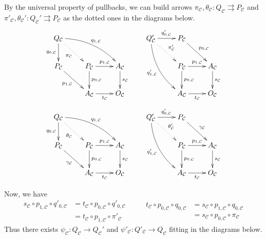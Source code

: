 \documentclass[a4paper,UKenglish,cleveref,pdftex,thm-restate,numberwithinsect]{lipics-v2021}
\renewcommand{\P}{\textbf {\textup{P}}}
\begin{document}
\begin{definition}
\begin{enumerate}
By the universal property of pullbacks, we can build arrows $\pi_{\mathcal{C}},\theta_{\mathcal{C}}\colon Q_{\mathcal{C}} \rightrightarrows P_{\mathcal{C}}$ and $\pi'_{\mathcal{C}},\theta_{\mathcal{C}}'\colon Q_{\mathcal{C}}'\rightrightarrows P_{\mathcal{C}}$ as the dotted ones in the diagrams below.
		\[\xymatrix{Q_{\mathcal{C}} \ar@/^.4cm/[drr]^{q_{1, \mathcal{C}}} \ar[d]_{q_{0, \mathcal{C}}} \ar@{.>}[dr]_{\pi_\mathcal{C}} &&&Q_{\mathcal{C}}' \ar[r]^{q'_{0, \mathcal{C}}} \ar@{.>}[dr]^{\pi_{\mathcal{C}}'} \ar@/_.4cm/[ddr]_{q'_{1, \mathcal{C}}}& P_{\mathcal{C}}\ar[dr]^{p_{0,\mathcal{C}}}\\P_{\mathcal{C}} \ar[dr]_{p_{1,\mathcal{C}}}&P_{\mathcal{C}} \ar[r]^{p_{1, \mathcal{C}}} \ar[d]^{p_{0, \mathcal{C}}} &A_{\mathcal{C}} \ar[d]^{s_{\mathcal{C}}} &  &P_{\mathcal{C}} \ar[r]^{p_{1, \mathcal{C}}} \ar[d]^{p_{0, \mathcal{C}}} &A_{\mathcal{C}} \ar[d]^{s_{\mathcal{C}}}\\ &A_{\mathcal{C}} \ar[r]_{t_{\mathcal{C}}}  &O_{\mathcal{C}} & &A_{\mathcal{C}} \ar[r]_{t_{\mathcal{C}}}  &O_{\mathcal{C}}}\]
			\[\xymatrix{Q_{\mathcal{C}} \ar@/^.4cm/[drr]^{q_{1, \mathcal{C}}} \ar[d]_{q_{0, \mathcal{C}}} \ar@{.>}[dr]_{\theta_{\mathcal{C}}} &&&Q_{\mathcal{C}}' \ar[r]^{q'_{0, \mathcal{C}}} \ar@{.>}[dr]^{\theta_{\mathcal{C}}'} \ar@/_.4cm/[ddr]_{q'_{1, \mathcal{C}}}& P_{\mathcal{C}}\ar[dr]^{\gamma_{\mathcal{C}}}\\P_{\mathcal{C}} \ar[dr]_{\gamma_{\mathcal{C}}}&P_{\mathcal{C}} \ar[r]^{p_{1, \mathcal{C}}} \ar[d]^{p_{0, \mathcal{C}}} &A_{\mathcal{C}} \ar[d]^{s_{\mathcal{C}}} &  &P_{\mathcal{C}} \ar[r]^{p_{1, \mathcal{C}}} \ar[d]^{p_{0, \mathcal{C}}} &A_{\mathcal{C}} \ar[d]^{s_{\mathcal{C}}}\\ &A_{\mathcal{C}} \ar[r]_{t_{\mathcal{C}}}  &O_{\mathcal{C}} & &A_{\mathcal{C}} \ar[r]_{t_{\mathcal{C}}}  &O_{\mathcal{C}}}\]
	
Now, we have
\[\begin{split}
	s_{\mathcal{C}}\circ p_{1, \mathcal{C}}\circ q'_{0, \mathcal{C}} &= t_{\mathcal{C}}\circ p_{0, \mathcal{C}}\circ q'_{0, \mathcal{C}}\\&=t_{\mathcal{C}}\circ p_{1, \mathcal{C} } \circ \pi'_{\mathcal{C}}
\end{split}\qquad \begin{split}
t_{\mathcal{C}}\circ p_{0, \mathcal{C}}\circ q_{0, \mathcal{C}} &= s_{\mathcal{C}}\circ p_{1, \mathcal{C}}\circ q_{0, \mathcal{C}}\\&=s_{\mathcal{C}}\circ p_{0, \mathcal{C} } \circ \pi_{\mathcal{C}}
\end{split}\]
 Thus there exists $\psi_{\mathcal{C}}\colon Q_{\mathcal{C}} \to Q_{\mathcal{C}}'$ and $\psi'_{\mathcal{C}}\colon Q'_\mathcal{C}\to Q_{\mathcal{C}}$ fitting in the diagrams below.
	

\end{enumerate}
\end{definition}
\end{document}
